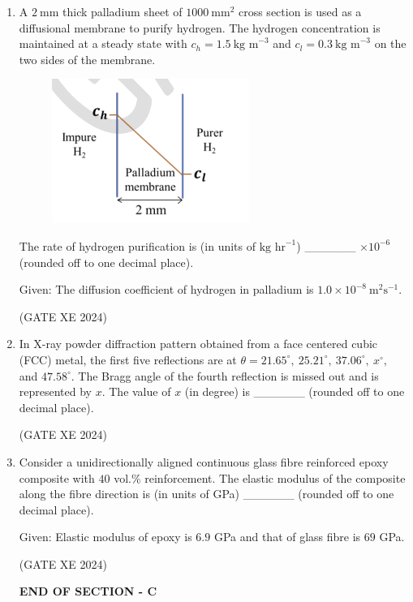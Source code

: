 \documentclass[12pt]{article}
\begin{document}
\begin{enumerate}
\item A $2\ \text{mm}$ thick palladium sheet of $1000\ \text{mm}^2$ cross section is used as a diffusional membrane to purify hydrogen. The hydrogen concentration is maintained at a steady state with $c_h=1.5\ \text{kg m}^{-3}$ and $c_l=0.3\ \text{kg m}^{-3}$ on the two sides of the membrane. 
\begin{figure}[H]
    \centering
    \includegraphics[width=0.5\columnwidth]{figs/ass5_c_q63.png}
    \caption{}
    \label{fig:placeholder}
\end{figure}


The rate of hydrogen purification is (in units of $\text{kg hr}^{-1}$) \_\_\_\_\_\_ $\times 10^{-6}$ (rounded off to one decimal place).

Given: The diffusion coefficient of hydrogen in palladium is $1.0\times 10^{-8}\ \text{m}^2\text{s}^{-1}$.

(GATE XE 2024)

\item In X-ray powder diffraction pattern obtained from a face centered cubic (FCC) metal, the first five reflections are at $\theta = 21.65^\circ,\ 25.21^\circ,\ 37.06^\circ,\ x^\circ,$ and $47.58^\circ$. The Bragg angle of the fourth reflection is missed out and is represented by $x$. The value of $x$ (in degree) is \_\_\_\_\_\_ (rounded off to one decimal place).

(GATE XE 2024)

\item Consider a unidirectionally aligned continuous glass fibre reinforced epoxy composite with $40$ vol.\% reinforcement. The elastic modulus of the composite along the fibre direction is (in units of GPa) \_\_\_\_\_\_ (rounded off to one decimal place).

Given: Elastic modulus of epoxy is $6.9$ GPa and that of glass fibre is $69$ GPa.

(GATE XE 2024)

\begin{center}
    \textbf{END OF SECTION - C}
\end{center}


\end{enumerate}
\end{document}

